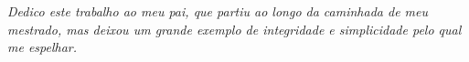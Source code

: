 \begin{dedicatoria}
   \vspace*{\fill}
   \textit{
      Dedico este trabalho ao meu pai, que partiu ao longo da caminhada de meu mestrado, mas deixou um grande exemplo de integridade e simplicidade pelo qual me espelhar.
   }
\end{dedicatoria}
